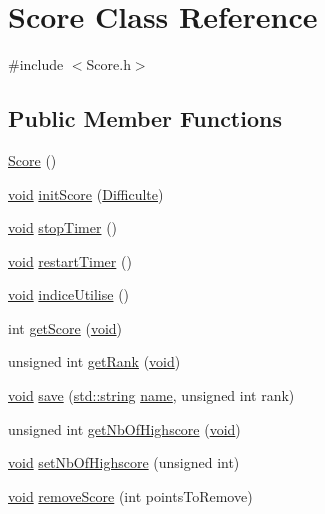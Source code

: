 \hypertarget{class_score}{}\section{Score Class Reference}
\label{class_score}


{\ttfamily \#include $<$Score.\+h$>$}

\subsection*{Public Member Functions}
\begin{DoxyCompactItemize}
\item 
\hyperlink{class_score_a039c99843551e5e4b512ecee99e46617}{Score} ()
\item 
\hyperlink{_s_d_l__opengl_8h_a3db05964a3cc4410f35b7ea2b7eb850d}{void} \hyperlink{class_score_a8b8619e94cb26fa0f3065ee75658ab2a}{init\+Score} (\hyperlink{_enum_difficulte_8h_ad3df9804641f6ea0105cd2a89f495555}{Difficulte})
\item 
\hyperlink{_s_d_l__opengl_8h_a3db05964a3cc4410f35b7ea2b7eb850d}{void} \hyperlink{class_score_a7fa693c1a4077a39b538746a8b9233af}{stop\+Timer} ()
\item 
\hyperlink{_s_d_l__opengl_8h_a3db05964a3cc4410f35b7ea2b7eb850d}{void} \hyperlink{class_score_af3c8e60dfb8bfaf49825fad704367c9c}{restart\+Timer} ()
\item 
\hyperlink{_s_d_l__opengl_8h_a3db05964a3cc4410f35b7ea2b7eb850d}{void} \hyperlink{class_score_a1b17a26b1333130341494b5033c7dce6}{indice\+Utilise} ()
\item 
int \hyperlink{class_score_a308e6e0968207bb20488eab4a7d1ec6f}{get\+Score} (\hyperlink{_s_d_l__opengl_8h_a3db05964a3cc4410f35b7ea2b7eb850d}{void})
\item 
unsigned int \hyperlink{class_score_a88dfdb3b5a40a7867dcae0af59c40715}{get\+Rank} (\hyperlink{_s_d_l__opengl_8h_a3db05964a3cc4410f35b7ea2b7eb850d}{void})
\item 
\hyperlink{_s_d_l__opengl_8h_a3db05964a3cc4410f35b7ea2b7eb850d}{void} \hyperlink{class_score_a2d42c505bd8610acb13d91f18e879db6}{save} (\hyperlink{_s_d_l__opengl_8h_ae9ea2d206f76ea82db7a2ea002fdef2f}{std\+::string} \hyperlink{_s_d_l__opengl_8h_af7477b8725fcf509c9623f64b9d09164}{name}, unsigned int rank)
\item 
unsigned int \hyperlink{class_score_a9fccb38a873e1f6a19d05764d1e102a5}{get\+Nb\+Of\+Highscore} (\hyperlink{_s_d_l__opengl_8h_a3db05964a3cc4410f35b7ea2b7eb850d}{void})
\item 
\hyperlink{_s_d_l__opengl_8h_a3db05964a3cc4410f35b7ea2b7eb850d}{void} \hyperlink{class_score_a8f599f2e372627824f24fcd0215035bb}{set\+Nb\+Of\+Highscore} (unsigned int)
\item 
\hyperlink{_s_d_l__opengl_8h_a3db05964a3cc4410f35b7ea2b7eb850d}{void} \hyperlink{class_score_a7111d7d073e8eb6ae65720a5e0bebf39}{remove\+Score} (int points\+To\+Remove)
\end{DoxyCompactItemize}


